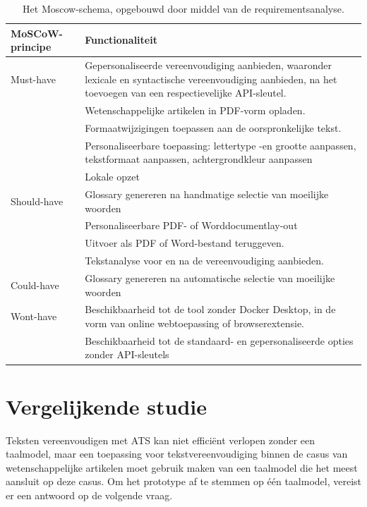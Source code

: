 \begin{center}
	\begin{table}
	\begin{tabular}{ | m{4cm} | m{12cm} | } 
		\hline
		\textbf{MoSCoW-principe} & Functionaliteit \\
		\hline
		Must-have & Gepersonaliseerde vereenvoudiging aanbieden, waaronder lexicale en syntactische vereenvoudiging aanbieden, na het toevoegen van een respectievelijke API-sleutel. \\
		& Wetenschappelijke artikelen in PDF-vorm opladen. \\
		& Formaatwijzigingen toepassen aan de oorspronkelijke tekst. \\
		& Personaliseerbare toepassing: lettertype -en grootte aanpassen, tekstformaat aanpassen, achtergrondkleur aanpassen \\
		& Lokale opzet \\
		\hline
		Should-have & Glossary genereren na handmatige selectie van moeilijke woorden \\
		& Personaliseerbare PDF- of Worddocumentlay-out \\
		& Uitvoer als PDF of Word-bestand teruggeven. \\
		& Tekstanalyse voor en na de vereenvoudiging aanbieden. \\
		\hline
		Could-have & Glossary genereren na automatische selectie van moeilijke woorden \\
		\hline
		Wont-have & Beschikbaarheid tot de tool zonder Docker Desktop, in de vorm van online webtoepassing of browserextensie. \\
		& Beschikbaarheid tot de standaard- en gepersonaliseerde opties zonder API-sleutels \\
		\hline
	\end{tabular}
	\caption{Het Moscow-schema, opgebouwd door middel van de requirementsanalyse.}
	\label{img:moscow-table}
	\end{table}
\end{center}

\section{Vergelijkende studie}
\label{sec:vergelijkende-studie}

Teksten vereenvoudigen met ATS kan niet efficiënt verlopen zonder een taalmodel, maar een toepassing voor tekstvereenvoudiging binnen de casus van wetenschappelijke artikelen moet gebruik maken van een taalmodel die het meest aansluit op deze casus. Om het prototype af te stemmen op één taalmodel, vereist er een antwoord op de volgende vraag. 

